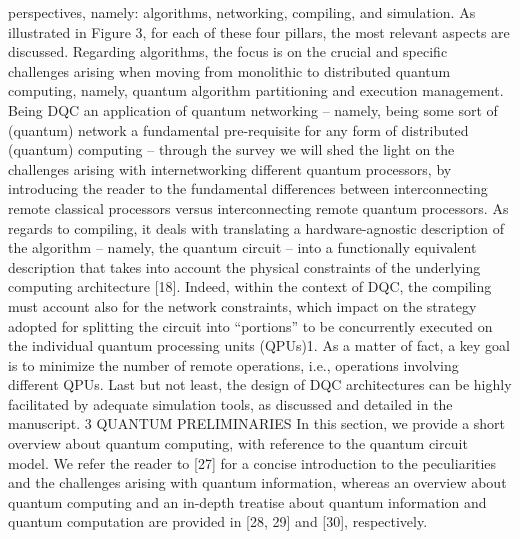 perspectives, namely: algorithms, networking, compiling, and simulation. As illustrated in Figure 3, for each of these four pillars, the most relevant aspects are discussed. Regarding algorithms, the focus is on the crucial and specific challenges arising when moving from monolithic to distributed quantum computing, namely, quantum algorithm partitioning and execution management. Being DQC an application of quantum networking – namely, being some sort of (quantum) network a fundamental pre-requisite for any form of distributed (quantum) computing – through the survey we will shed the light on the challenges arising with internetworking different quantum processors, by introducing the reader to the fundamental differences between interconnecting remote classical processors versus interconnecting remote quantum processors. As regards to compiling, it deals with translating a hardware-agnostic description of the algorithm – namely, the quantum circuit – into a functionally equivalent description that takes into account the physical constraints of the underlying computing architecture [18]. Indeed, within the context of DQC, the compiling must account also for the network constraints, which impact on the strategy adopted for splitting the circuit into “portions” to be concurrently executed on the individual quantum processing units (QPUs)1. As a matter of fact, a key goal is to minimize the number of remote operations, i.e., operations involving different QPUs. Last but not least, the design of DQC architectures can be highly facilitated by adequate simulation tools, as discussed and detailed in the manuscript. 3 QUANTUM PRELIMINARIES In this section, we provide a short overview about quantum computing, with reference to the quantum circuit model. We refer the reader to [27] for a concise introduction to the peculiarities and the challenges arising with quantum information, whereas an overview about quantum computing and an in-depth treatise about quantum information and quantum computation are provided in [28, 29] and [30], respectively. 

